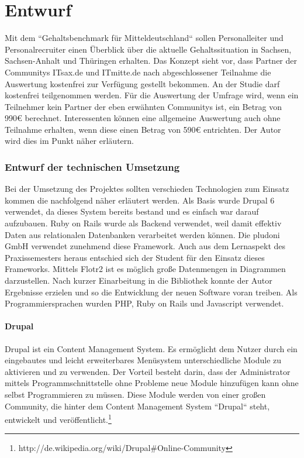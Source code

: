 \part{Entwurf}
\label{sec:entwurf}
Mit dem ``Gehaltsbenchmark für Mitteldeutschland`` sollen Personalleiter und Personalrecruiter einen Überblick über die aktuelle Gehaltssituation in Sachsen, Sachsen-Anhalt und Thüringen erhalten. 
Das Konzept sieht vor, dass Partner der Communitys ITsax.de und ITmitte.de nach abgeschlossener Teilnahme die Auswertung kostenfrei zur Verfügung gestellt bekommen. An der Studie darf kostenfrei teilgenommen werden. Für die Auswertung der Umfrage wird, wenn ein Teilnehmer kein Partner der eben erwähnten Communitys ist, ein Betrag von 990€ berechnet. 
Interessenten können eine allgemeine Auswertung auch ohne Teilnahme erhalten, wenn diese einen Betrag von 590€ entrichten. Der Autor wird dies im Punkt  näher erläutern.
\section{Entwurf der technischen Umsetzung}
Bei der Umsetzung des Projektes sollten verschieden Technologien zum Einsatz kommen die nachfolgend näher erläutert werden. Als Basis wurde Drupal 6 verwendet, da dieses System bereits bestand und es einfach war darauf aufzubauen. Ruby on Rails wurde als Backend verwendet, weil damit effektiv Daten aus relationalen Datenbanken verarbeitet werden können. Die pludoni GmbH verwendet zunehmend diese Framework. Auch aus dem Lernaspekt des Praxissemesters heraus entschied sich der Student für den Einsatz dieses Frameworks. Mittels Flotr2 ist es möglich große Datenmengen in Diagrammen darzustellen. Nach kurzer Einarbeitung in die Bibliothek konnte der Autor Ergebnisse erzielen und so die Entwicklung der neuen Software voran treiben. 
Als Programmiersprachen wurden PHP, Ruby on Rails \cite{rails} und Javascript verwendet. 
\subsection{Drupal}
Drupal ist ein Content Management System. Es ermöglicht dem Nutzer durch ein eingebautes und leicht erweiterbares Menüsystem unterschiedliche Module zu aktivieren und zu verwenden. 
Der Vorteil besteht darin, dass der Administrator mittels Programmschnittstelle ohne Probleme neue Module hinzufügen kann ohne selbst Programmieren zu müssen. 
Diese Module werden von einer großen Community, die hinter dem Content Management System ``Drupal`` steht, entwickelt und veröffentlicht.\footnote{http://de.wikipedia.org/wiki/Drupal\#Online-Community}
